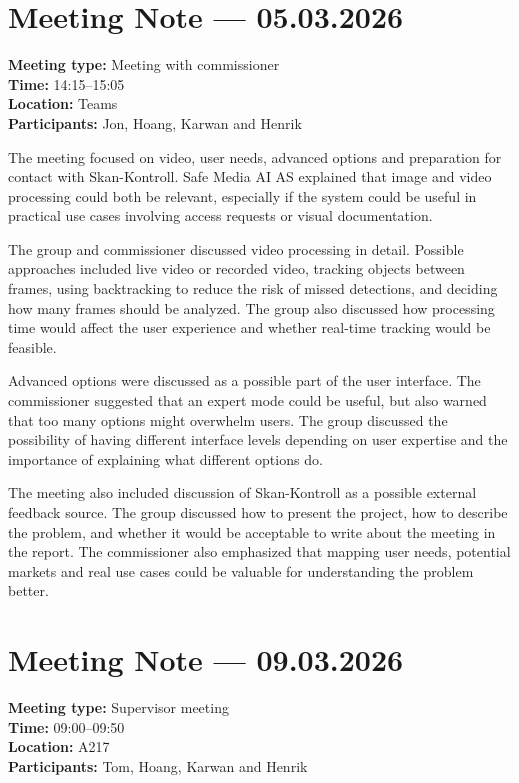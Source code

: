 \section{Meeting Note --- 05.03.2026}
\label{app:meeting-2026-03-05}
\textbf{Meeting type:} Meeting with commissioner\\
\textbf{Time:} 14:15--15:05\\
\textbf{Location:} Teams\\
\textbf{Participants:} Jon, Hoang, Karwan and Henrik

The meeting focused on video, user needs, advanced options and preparation for contact with Skan-Kontroll. Safe Media AI AS explained that image and video processing could both be relevant, especially if the system could be useful in practical use cases involving access requests or visual documentation.

The group and commissioner discussed video processing in detail. Possible approaches included live video or recorded video, tracking objects between frames, using backtracking to reduce the risk of missed detections, and deciding how many frames should be analyzed. The group also discussed how processing time would affect the user experience and whether real-time tracking would be feasible.

Advanced options were discussed as a possible part of the user interface. The commissioner suggested that an expert mode could be useful, but also warned that too many options might overwhelm users. The group discussed the possibility of having different interface levels depending on user expertise and the importance of explaining what different options do.

The meeting also included discussion of Skan-Kontroll as a possible external feedback source. The group discussed how to present the project, how to describe the problem, and whether it would be acceptable to write about the meeting in the report. The commissioner also emphasized that mapping user needs, potential markets and real use cases could be valuable for understanding the problem better.

\section{Meeting Note --- 09.03.2026}
\label{app:meeting-2026-03-09}
\textbf{Meeting type:} Supervisor meeting\\
\textbf{Time:} 09:00--09:50\\
\textbf{Location:} A217\\
\textbf{Participants:} Tom, Hoang, Karwan and Henrik

